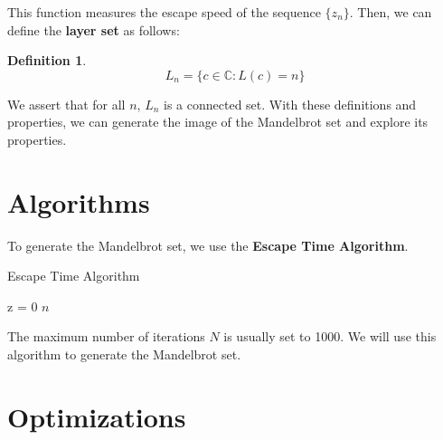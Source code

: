 \documentclass[11pt]{article}
\newtheorem{definition}{Definition}
\begin{document}
    This function measures the escape speed of the sequence $\{z_n\}$.
    Then, we can define the \textbf{layer set} as follows:

    \begin{definition}
        \begin{equation}
            L_n = \{c \in \mathbb{C} : L(c) = n \} \label{eq:layer_set}
        \end{equation}
    \end{definition}

    We assert that for all $n$, $L_n$ is a connected set.
    With these definitions and properties, we can generate the image of the Mandelbrot set and explore its properties.


    \section{Algorithms}\label{sec:algorithms}

    To generate the Mandelbrot set, we use the \textbf{Escape Time Algorithm}.

    \begin{algorithm}[H]
        \SetAlgoLined
        \caption{Escape Time Algorithm}
        \label{alg:escape_time_algorithm}
        z = 0\;
        \Return $n$\;
    \end{algorithm}

    The maximum number of iterations $N$ is usually set to 1000.
    We will use this algorithm to generate the Mandelbrot set.


    \section{Optimizations}\label{sec:optimizations}





    
    
\end{document}
